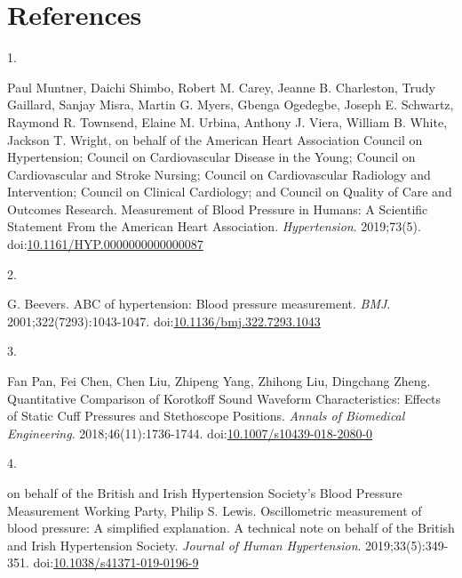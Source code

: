 \documentclass[
  12pt,
  letterpaper,
  openany,
  oneside]{book}
\newlength{\cslhangindent}
\newlength{\csllabelwidth}
\newenvironment{CSLReferences}[2] %
 {\begin{list}{}{%
  \setlength{\itemindent}{0pt}
  \setlength{\leftmargin}{0pt}
  \setlength{\parsep}{0pt}
  \ifodd #1
   \setlength{\leftmargin}{\cslhangindent}
   \setlength{\itemindent}{-1\cslhangindent}
  \fi
  \setlength{\itemsep}{#2\baselineskip}}}
 {\end{list}}
\newcommand{\CSLLeftMargin}[1]{\parbox[t]{\csllabelwidth}{\strut#1\strut}}
\newcommand{\CSLRightInline}[1]{\parbox[t]{\linewidth - \csllabelwidth}{\strut#1\strut}}
\begin{document}
\chapter*{References}\label{references}


\label{refs}
\begin{CSLReferences}{0}{1}
\CSLLeftMargin{1. }%
\CSLRightInline{Paul Muntner, Daichi Shimbo, Robert M. Carey, Jeanne B.
Charleston, Trudy Gaillard, Sanjay Misra, Martin G. Myers, Gbenga
Ogedegbe, Joseph E. Schwartz, Raymond R. Townsend, Elaine M. Urbina,
Anthony J. Viera, William B. White, Jackson T. Wright, on behalf of the
American Heart Association Council on Hypertension; Council on
Cardiovascular Disease in the Young; Council on Cardiovascular and
Stroke Nursing; Council on Cardiovascular Radiology and Intervention;
Council on Clinical Cardiology; and Council on Quality of Care and
Outcomes Research. Measurement of {Blood} {Pressure} in {Humans}: {A}
{Scientific} {Statement} {From} the {American} {Heart} {Association}.
\emph{Hypertension}. 2019;73(5).
doi:\href{https://doi.org/10.1161/HYP.0000000000000087}{10.1161/HYP.0000000000000087}}

\CSLLeftMargin{2. }%
\CSLRightInline{G. Beevers. {ABC} of hypertension: {Blood} pressure
measurement. \emph{BMJ}. 2001;322(7293):1043-1047.
doi:\href{https://doi.org/10.1136/bmj.322.7293.1043}{10.1136/bmj.322.7293.1043}}

\CSLLeftMargin{3. }%
\CSLRightInline{Fan Pan, Fei Chen, Chen Liu, Zhipeng Yang, Zhihong Liu,
Dingchang Zheng. Quantitative {Comparison} of {Korotkoff} {Sound}
{Waveform} {Characteristics}: {Effects} of {Static} {Cuff} {Pressures}
and {Stethoscope} {Positions}. \emph{Annals of Biomedical Engineering}.
2018;46(11):1736-1744.
doi:\href{https://doi.org/10.1007/s10439-018-2080-0}{10.1007/s10439-018-2080-0}}

\CSLLeftMargin{4. }%
\CSLRightInline{on behalf of the British and Irish Hypertension
Society's Blood Pressure Measurement Working Party, Philip S. Lewis.
Oscillometric measurement of blood pressure: A simplified explanation.
{A} technical note on behalf of the {British} and {Irish} {Hypertension}
{Society}. \emph{Journal of Human Hypertension}. 2019;33(5):349-351.
doi:\href{https://doi.org/10.1038/s41371-019-0196-9}{10.1038/s41371-019-0196-9}}


\end{CSLReferences}
\end{document}
